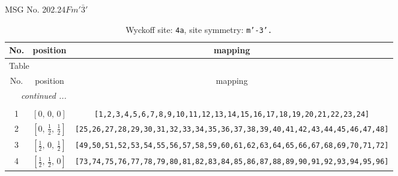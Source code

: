 \documentclass[fleqn,8pt]{jsarticle}
\begin{document}
\setcounter{MaxMatrixCols}{32}

\renewcommand{\tablename}{Table~}
\renewcommand{\figurename}{Figure~}
\begin{center}
\LARGE
MSG No. 202.24\quad$Fm'\bar{3}'$
\end{center}
\renewcommand{\arraystretch}{1.2}
\begin{longtable}{ccc}
\caption{Wyckoff site: {\tt 4a}, site symmetry: {\tt m'-3'.}}
 \\
 \hline \hline
No. & position & mapping \\ \hline \endfirsthead

\multicolumn{2}{l}{\tablename\ \thetable{}} \\
 \hline \hline
No. & position & mapping \\ \hline \endhead

 \hline \hline
\multicolumn{2}{r}{\footnotesize\it continued ...} \\ \endfoot

 \hline \hline
\multicolumn{2}{r}{} \\ \endlastfoot

1 & $\left[ 0,\, 0,\, 0 \right]$ & {\tt [1,2,3,4,5,6,7,8,9,10,11,12,13,14,15,16,17,18,19,20,21,22,23,24]} \\ \hline
2 & $\left[ 0,\, \frac{1}{2},\, \frac{1}{2} \right]$ & {\tt [25,26,27,28,29,30,31,32,33,34,35,36,37,38,39,40,41,42,43,44,45,46,47,48]} \\ \hline
3 & $\left[ \frac{1}{2},\, 0,\, \frac{1}{2} \right]$ & {\tt [49,50,51,52,53,54,55,56,57,58,59,60,61,62,63,64,65,66,67,68,69,70,71,72]} \\ \hline
4 & $\left[ \frac{1}{2},\, \frac{1}{2},\, 0 \right]$ & {\tt [73,74,75,76,77,78,79,80,81,82,83,84,85,86,87,88,89,90,91,92,93,94,95,96]} \\
\end{longtable}
\renewcommand{\arraystretch}{1.2}
\end{document}
